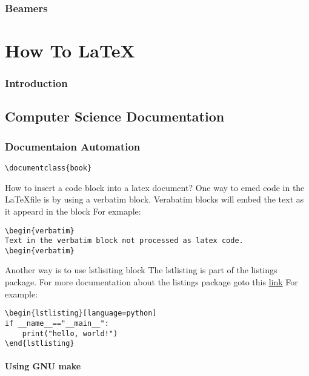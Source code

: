 \documentclass[12pt]{book}
\begin{document}
\section{Beamers}


\part{How To \LaTeX}
\section{Introduction}
\chapter{Computer Science Documentation}
\section{Documentaion Automation}
\begin{verbatim}
\documentclass{book}
\end{verbatim}

\newpage
How to insert a code block into a latex document?
\newline One way to emed code in the \LaTeX  file is by using a verbatim 
block. Verabatim blocks will embed the text as it 
appeard in the block
\newline For exmaple:
\begin{verbatim}
\begin{verbatim}
Text in the verbatim block not processed as latex code.
\begin{verbatim}
\end{verbatim}
Another way is to use lstlisiting block
The lstlisting is part of the listings package.
For more documentation about the listings package goto this \href{https://ctan.math.illinois.edu/macros/latex/contrib/listings/listings.pdf}{link}
\newline For example:
\begin{verbatim}
\begin{lstlisting}[language=python]
if __name__=="__main__":
    print("hello, world!")
\end{lstlisting}
\end{verbatim}
\subsection{Using GNU make}
\end{document}
